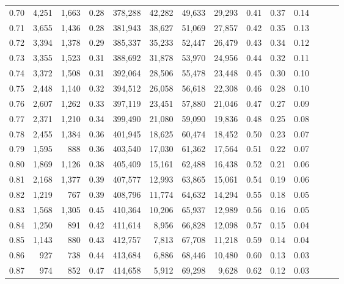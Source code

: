 \begin{tabular}{rrrrrrrrrrrrrr}
0.70 &   4,251 &  1,663 &  0.28 &  378,288 &   42,282 &  49,633 &  29,293 &  0.41 &  0.37 &      0.14 \\
0.71 &   3,655 &  1,436 &  0.28 &  381,943 &   38,627 &  51,069 &  27,857 &  0.42 &  0.35 &      0.13 \\
0.72 &   3,394 &  1,378 &  0.29 &  385,337 &   35,233 &  52,447 &  26,479 &  0.43 &  0.34 &      0.12 \\
0.73 &   3,355 &  1,523 &  0.31 &  388,692 &   31,878 &  53,970 &  24,956 &  0.44 &  0.32 &      0.11 \\
0.74 &   3,372 &  1,508 &  0.31 &  392,064 &   28,506 &  55,478 &  23,448 &  0.45 &  0.30 &      0.10 \\
0.75 &   2,448 &  1,140 &  0.32 &  394,512 &   26,058 &  56,618 &  22,308 &  0.46 &  0.28 &      0.10 \\
0.76 &   2,607 &  1,262 &  0.33 &  397,119 &   23,451 &  57,880 &  21,046 &  0.47 &  0.27 &      0.09 \\
0.77 &   2,371 &  1,210 &  0.34 &  399,490 &   21,080 &  59,090 &  19,836 &  0.48 &  0.25 &      0.08 \\
0.78 &   2,455 &  1,384 &  0.36 &  401,945 &   18,625 &  60,474 &  18,452 &  0.50 &  0.23 &      0.07 \\
0.79 &   1,595 &    888 &  0.36 &  403,540 &   17,030 &  61,362 &  17,564 &  0.51 &  0.22 &      0.07 \\
0.80 &   1,869 &  1,126 &  0.38 &  405,409 &   15,161 &  62,488 &  16,438 &  0.52 &  0.21 &      0.06 \\
0.81 &   2,168 &  1,377 &  0.39 &  407,577 &   12,993 &  63,865 &  15,061 &  0.54 &  0.19 &      0.06 \\
0.82 &   1,219 &    767 &  0.39 &  408,796 &   11,774 &  64,632 &  14,294 &  0.55 &  0.18 &      0.05 \\
0.83 &   1,568 &  1,305 &  0.45 &  410,364 &   10,206 &  65,937 &  12,989 &  0.56 &  0.16 &      0.05 \\
0.84 &   1,250 &    891 &  0.42 &  411,614 &    8,956 &  66,828 &  12,098 &  0.57 &  0.15 &      0.04 \\
0.85 &   1,143 &    880 &  0.43 &  412,757 &    7,813 &  67,708 &  11,218 &  0.59 &  0.14 &      0.04 \\
0.86 &     927 &    738 &  0.44 &  413,684 &    6,886 &  68,446 &  10,480 &  0.60 &  0.13 &      0.03 \\
0.87 &     974 &    852 &  0.47 &  414,658 &    5,912 &  69,298 &   9,628 &  0.62 &  0.12 &      0.03 \\

\end{tabular}
